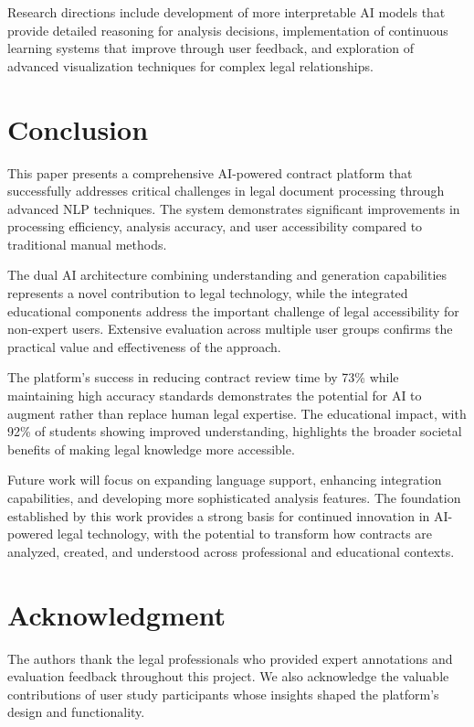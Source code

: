 \documentclass[conference]{IEEEtran}
\begin{document}
Research directions include development of more interpretable AI models that provide detailed reasoning for analysis decisions, implementation of continuous learning systems that improve through user feedback, and exploration of advanced visualization techniques for complex legal relationships.

\section{Conclusion}

This paper presents a comprehensive AI-powered contract platform that successfully addresses critical challenges in legal document processing through advanced NLP techniques. The system demonstrates significant improvements in processing efficiency, analysis accuracy, and user accessibility compared to traditional manual methods.

The dual AI architecture combining understanding and generation capabilities represents a novel contribution to legal technology, while the integrated educational components address the important challenge of legal accessibility for non-expert users. Extensive evaluation across multiple user groups confirms the practical value and effectiveness of the approach.

The platform's success in reducing contract review time by 73\% while maintaining high accuracy standards demonstrates the potential for AI to augment rather than replace human legal expertise. The educational impact, with 92\% of students showing improved understanding, highlights the broader societal benefits of making legal knowledge more accessible.

Future work will focus on expanding language support, enhancing integration capabilities, and developing more sophisticated analysis features. The foundation established by this work provides a strong basis for continued innovation in AI-powered legal technology, with the potential to transform how contracts are analyzed, created, and understood across professional and educational contexts.

\section*{Acknowledgment}

The authors thank the legal professionals who provided expert annotations and evaluation feedback throughout this project. We also acknowledge the valuable contributions of user study participants whose insights shaped the platform's design and functionality.
\end{document}
